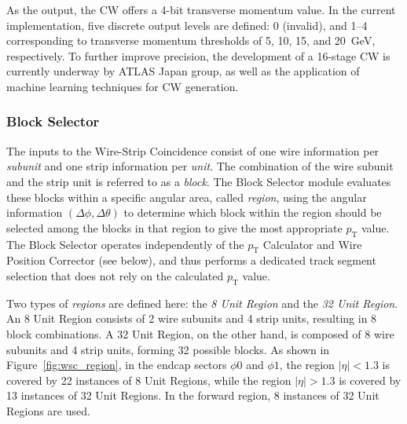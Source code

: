 

As the output, the CW offers a 4-bit transverse momentum value. In the current implementation, five discrete output levels are defined: 0 (invalid), and 1–4 corresponding to transverse momentum thresholds of 5, 10, 15, and 20~GeV, respectively. To further improve precision, the development of a 16-stage CW is currently underway by ATLAS Japan group, as well as the application of machine learning techniques for CW generation.

\subsubsection{Block Selector}

The inputs to the Wire-Strip Coincidence consist of one wire information per \textit{subunit} and one strip information per \textit{unit}. The combination of the wire subunit and the strip unit is referred to as a \textit{block}. The Block Selector module evaluates these blocks within a specific angular area, called \textit{region}, using the angular information \((\Delta\phi, \Delta\theta)\) to determine which block within the region should be selected among the blocks in that region to give the most appropriate $p_{\mathrm{T}}$ value. The Block Selector operates independently of the $p_{\mathrm{T}}$ Calculator and Wire Position Corrector (see below), and thus performs a dedicated track segment selection that does not rely on the calculated \(p_{\mathrm{T}}\) value.

Two types of \textit{regions} are defined here: the \textit{8 Unit Region} and the \textit{32 Unit Region}. An 8 Unit Region consists of 2 wire subunits and 4 strip units, resulting in 8 block combinations. A 32 Unit Region, on the other hand, is composed of 8 wire subunits and 4 strip units, forming 32 possible blocks. As shown in Figure~\ref{fig:wsc_region}, in the endcap sectors \(\phi0\) and \(\phi1\), the region \(|\eta| < 1.3\) is covered by 22 instances of 8 Unit Regions, while the region \(|\eta| > 1.3\) is covered by 13 instances of 32 Unit Regions. In the forward region, 8 instances of 32 Unit Regions are used.

